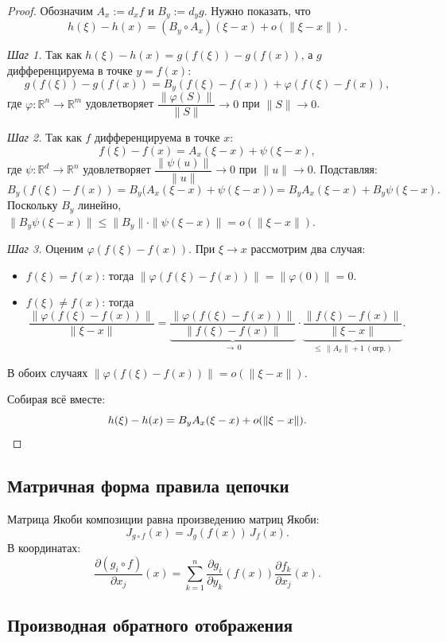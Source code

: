 \begin{proof}
	Обозначим $A_x := d_xf$ и $B_y := d_yg$. Нужно показать, что
	\[
	h(\xi)-h(x) = (B_y\circ A_x)(\xi-x)+o(\|\xi-x\|).
	\]
	
	\textit{Шаг 1.} Так как $h(\xi)-h(x)=g(f(\xi))-g(f(x))$, а $g$ дифференцируема
	в точке $y=f(x)$:
	\[
	g(f(\xi))-g(f(x))=B_y(f(\xi)-f(x))+\varphi(f(\xi)-f(x)),
	\]
	где $\varphi\colon\mathbb{R}^n\to\mathbb{R}^m$ удовлетворяет
	$\dfrac{\|\varphi(S)\|}{\|S\|}\to 0$ при $\|S\|\to 0$.
	
	\textit{Шаг 2.} Так как $f$ дифференцируема в точке $x$:
	\[
	f(\xi)-f(x)=A_x(\xi-x)+\psi(\xi-x),
	\]
	где $\psi\colon\mathbb{R}^d\to\mathbb{R}^n$ удовлетворяет
	$\dfrac{\|\psi(u)\|}{\|u\|}\to 0$ при $\|u\|\to 0$.
	Подставляя:
	\[
	B_y(f(\xi)-f(x))=B_y\bigl(A_x(\xi-x)+\psi(\xi-x)\bigr)
	=B_y A_x(\xi-x)+B_y\psi(\xi-x).
	\]
	Поскольку $B_y$ линейно, $\|B_y\psi(\xi-x)\|\le\|B_y\|\cdot\|\psi(\xi-x)\|=o(\|\xi-x\|)$.
	
	\textit{Шаг 3.} Оценим $\varphi(f(\xi)-f(x))$. При $\xi\to x$ рассмотрим два случая:
	\begin{itemize}
		\item $f(\xi)=f(x)$: тогда $\|\varphi(f(\xi)-f(x))\|=\|\varphi(0)\|=0$.
		\item $f(\xi)\ne f(x)$: тогда
		\[
		\frac{\|\varphi(f(\xi)-f(x))\|}{\|\xi-x\|}
		=
		\underbrace{\frac{\|\varphi(f(\xi)-f(x))\|}{\|f(\xi)-f(x)\|}}_{\to\,0}
		\cdot
		\underbrace{\frac{\|f(\xi)-f(x)\|}{\|\xi-x\|}}_{\le\,\|A_x\|+1\ (\text{огр.})}.
		\]
	\end{itemize}
	В обоих случаях $\|\varphi(f(\xi)-f(x))\|=o(\|\xi-x\|)$.
	
	Собирая всё вместе:
	\[
	h(\xi)-h(x)=B_y A_x(\xi-x)+o(\|\xi-x\|). \qedhere
	\]
\end{proof}

\subsection{Матричная форма правила цепочки}

Матрица Якоби композиции равна произведению матриц Якоби:
\[
J_{g\circ f}(x)=J_g(f(x))\,J_f(x).
\]
В координатах:
\[
\frac{\partial (g_i\circ f)}{\partial x_j}(x)
=
\sum_{k=1}^{n}
\frac{\partial g_i}{\partial y_k}(f(x))
\frac{\partial f_k}{\partial x_j}(x).
\]

\subsection{Производная обратного отображения}

